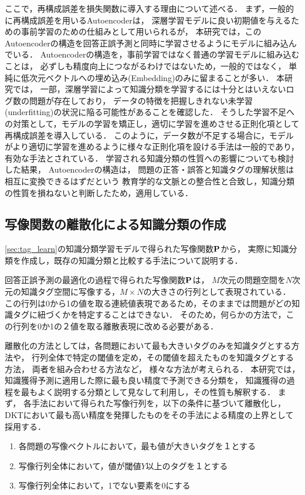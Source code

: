 ここで，再構成誤差を損失関数に導入する理由について述べる．
まず，一般的に再構成誤差を用いるAutoencoderは，
深層学習モデルに良い初期値を与えるための事前学習のための仕組みとして用いられるが，
本研究では，このAutoencoderの構造を回答正誤予測と同時に学習させるようにモデルに組み込んでいる．
Autoencoderの構造を，事前学習ではなく普通の学習モデルに組み込むことは，
必ずしも精度向上につながるわけではないため，一般的ではなく，
単純に低次元ベクトルへの埋め込み(Embedding)のみに留まることが多い．
本研究では，
一部，深層学習によって知識分類を学習するには十分とはいえないログ数の問題が存在しており，
データの特徴を把握しきれない未学習(underfitting)の状況に陥る可能性があることを確認した．
そうした学習不足への対策として，モデルの学習を矯正し，適切に学習を進めさせる正則化項として再構成誤差を導入している．
このように，データ数が不足する場合に，モデルがより適切に学習を進めるように様々な正則化項を設ける手法は一般的であり，
有効な手法とされている．
学習される知識分類の性質への影響についても検討した結果，
Autoencoderの構造は，
問題の正答・誤答と知識タグの理解状態は相互に変換できるはずだという
教育学的な文脈との整合性と合致し，知識分類の性質を損ねないと判断したため，適用している．



\subsection{写像関数の離散化による知識分類の作成}
\ref{sec:tag_learn}の知識分類学習モデルで得られた写像関数${\bf P}$から，
実際に知識分類を作成し，既存の知識分類と比較する手法について説明する．


回答正誤予測の最適化の過程で得られた写像関数${\bf P}$は，
$M$次元の問題空間を$N$次元の知識タグ空間に写像する，$M　\times N$の大きさの行列として表現されている．
この行列は0から1の値を取る連続値表現であるため，そのままでは問題がどの知識タグに紐づくかを特定することはできない．
そのため，何らかの方法で，この行列を0か1の２値を取る離散表現に改める必要がある．

離散化の方法としては，各問題において最も大きいタグのみを知識タグとする方法や，
行列全体で特定の閾値を定め，その閾値を超えたものを知識タグとする方法，
両者を組み合わせる方法など，
様々な方法が考えられる．
本研究では，知識獲得予測に適用した際に最も良い精度で予測できる分類を，
知識獲得の過程を最もよく説明する分類として見なして利用し，その性質も解釈する．
まず，
各手法において得られた写像行列を，以下の条件に基づいて離散化し，
DKTにおいて最も高い精度を発揮したものをその手法による精度の上界として採用する．
\begin{enumerate}
\item 各問題の写像ベクトルにおいて，最も値が大きいタグを１とする
\item 写像行列全体において，値が閾値$Y$以上のタグを１とする
\item 写像行列全体において，1でない要素を0にする
\end{enumerate}


